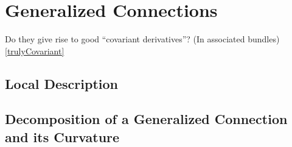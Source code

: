 {\section{Generalized Connections}

Do they give rise to good ``covariant derivatives''? (In associated bundles) \ref{trulyCovariant}



\subsection{Local Description}
\subsection{Decomposition of a Generalized Connection and its Curvature}
}

